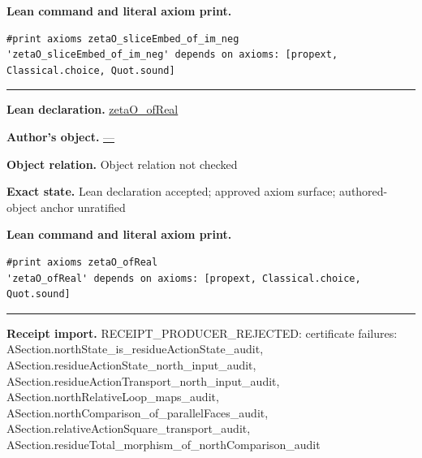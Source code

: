 \documentclass[11pt]{article}
\theoremstyle{plain}
\theoremstyle{definition}
\theoremstyle{remark}
\begin{document}
\begin{tcolorbox}[provenancecard,title={17. Definition - Octonionic zeta},title after break={17. Definition - Octonionic zeta (continued)}]
\par\smallskip\textbf{Lean command and literal axiom print.}
\begin{Verbatim}[breaklines=true,breakanywhere=true,fontsize=\small]
#print axioms zetaO_sliceEmbed_of_im_neg
'zetaO_sliceEmbed_of_im_neg' depends on axioms: [propext, Classical.choice, Quot.sound]
\end{Verbatim}
\medskip\hrule\medskip
\textbf{Lean declaration.} \url{zetaO_ofReal}
\par\textbf{Author's object.} \url{—}
\par\textbf{Object relation.} Object relation not checked
\par\textbf{Exact state.} Lean declaration accepted; approved axiom surface; authored-object anchor unratified
\par\smallskip\textbf{Lean command and literal axiom print.}
\begin{Verbatim}[breaklines=true,breakanywhere=true,fontsize=\small]
#print axioms zetaO_ofReal
'zetaO_ofReal' depends on axioms: [propext, Classical.choice, Quot.sound]
\end{Verbatim}
\medskip\hrule\medskip
\textbf{Receipt import.} \textcolor{KgtRed}{RECEIPT\_PRODUCER\_REJECTED: certificate failures: ASection.northState\_is\_residueActionState\_audit, ASection.residueActionState\_north\_input\_audit, ASection.residueActionTransport\_north\_input\_audit, ASection.northRelativeLoop\_maps\_audit, ASection.northComparison\_of\_parallelFaces\_audit, ASection.relativeActionSquare\_transport\_audit, ASection.residueTotal\_morphism\_of\_northComparison\_audit}
\end{tcolorbox}
\medskip
\end{document}
